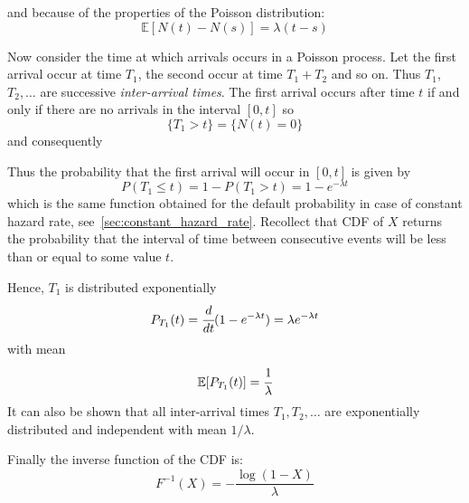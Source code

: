 and because of the properties of the Poisson distribution:
\begin{equation}
\mathbb{E}[N(t)-N(s)]=\lambda (t-s)
\end{equation}

Now consider the time at which arrivals occurs in a Poisson process. Let the first arrival occur at time $T_1$, the second occur at time $T_1 + T_2$ and so on. Thus $T_1$, $T_2, \ldots$ are successive \emph{inter-arrival times}. The first arrival occurs after time $t$ if and only if there are no arrivals in the interval $[0,t]$ so 
\begin{equation}
\{T_1>t\}=\{N(t)=0\}
\end{equation}
and consequently
\begin{equation}
\end{equation}

Thus the probability that the first arrival will occur in $[0,t]$ is given by
\begin{equation}
P(T_1\le t)= 1-P(T_1>t)=1-e^{-\lambda t}
\end{equation}
which is the same function obtained for the default probability in case of constant hazard rate, see~\ref{sec:constant_hazard_rate}.
Recollect that CDF of $X$ returns the probability that the interval of time between consecutive events will be less than or equal to some value $t$.

Hence, $T_1$ is distributed exponentially
\begin{equation}
P_{T_1}(t) = \cfrac{d}{dt}(1-e^{-\lambda t}) = \lambda e^{-\lambda t}
\end{equation}
with mean  
\begin{equation}
\mathbb{E}[P_{T_1}(t)] = \cfrac{1}{\lambda}
\end{equation}
It can also be shown that all inter-arrival times $T_1, T_2,\ldots$ are exponentially distributed and independent with mean $1/\lambda$.

Finally the inverse function of the CDF is:
\begin{equation}
F^{-1}(X) = -\frac{\log(1-X)}{\lambda}
\end{equation}

